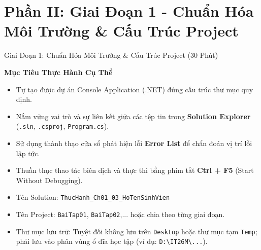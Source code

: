 \documentclass[aspectratio=169, 10pt]{beamer}
\begin{document}
\section{Phần II: Giai Đoạn 1 - Chuẩn Hóa Môi Trường \& Cấu Trúc Project}

\begin{frame}{Giai Đoạn 1: Chuẩn Hóa Môi Trường \& Cấu Trúc Project (30 Phút)}
  \begin{block}{\textbf{Mục Tiêu Thực Hành Cụ Thể}}
    \begin{itemize}
      \item Tự tạo được dự án Console Application (.NET) đúng cấu trúc thư mục quy định.
      \item Nắm vững vai trò và sự liên kết giữa các tệp tin trong \textbf{Solution Explorer} (\texttt{.sln}, \texttt{.csproj}, \texttt{Program.cs}).
      \item Sử dụng thành thạo cửa sổ phát hiện lỗi \textbf{Error List} để chẩn đoán vị trí lỗi lập tức.
      \item Thuần thục thao tác biên dịch và thực thi bằng phím tắt \textbf{Ctrl + F5} (Start Without Debugging).
    \end{itemize}
  \end{block}
  \begin{tcolorbox}[colback=UniGreen!10,colframe=UniGreen,title=\textbf{Chuẩn Quy Ước Đặt Tên Tại Khoa CNTT}]
    \begin{itemize}
      \item Tên Solution: \texttt{ThucHanh\_Ch01\_03\_HoTenSinhVien}
      \item Tên Project: \texttt{BaiTap01}, \texttt{BaiTap02},... hoặc chia theo từng giai đoạn.
      \item Thư mục lưu trữ: Tuyệt đối không lưu trên \texttt{Desktop} hoặc thư mục tạm \texttt{Temp}; phải lưu vào phân vùng ổ đĩa học tập (ví dụ: \texttt{D:\textbackslash IT26M\textbackslash...}).
    \end{itemize}
  \end{tcolorbox}
\end{frame}
\end{document}
